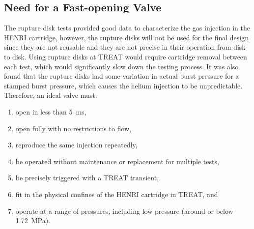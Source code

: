 \subsection{Need for a Fast-opening Valve} \label{ss:need for valve}


The rupture disk tests provided good data to characterize the gas injection in the HENRI cartridge, however, the rupture disks will not be used for the final design since they are not reusable and they are not precise in their operation from disk to disk. Using rupture disks at TREAT would require cartridge removal between each test, which would significantly slow down the testing process. It was also found that the rupture disks had some variation in actual burst pressure for a stamped burst pressure, which causes the helium injection to be unpredictable. Therefore, an ideal valve must:
\begin{enumerate}
    \item open in less than \SI{5}{\milli\second},
    \item open fully with no restrictions to flow,
    \item reproduce the same injection repeatedly,
    \item be operated without maintenance or replacement for multiple tests,
    \item be precisely triggered with a TREAT transient,
    \item fit in the physical confines of the HENRI cartridge in TREAT, and
    \item operate at a range of pressures, including low pressure (around or below \SI{1.72}{\mega\pascal}).
\end{enumerate}


